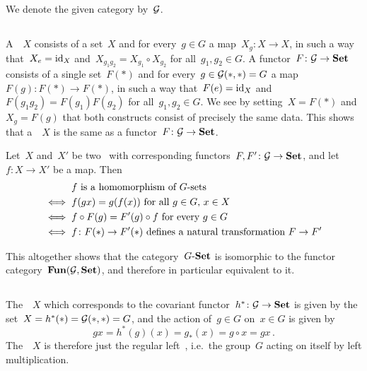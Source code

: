 \section{}

We denote the given category by~$\mathcal{G}$.





\subsection{}

A~~$X$ consists of a set~$X$ and for every~$g \in G$ a map~$X_g \colon X \to X$, in such a way that~$X_e = \operatorname{id}_X$ and~$X_{g_1 g_2} = X_{g_1} \circ X_{g_2}$ for all~$g_1, g_2 \in G$.
A functor~$F \colon \mathcal{G} \to \mathbf{Set}$ consists of a single set~$F(\ast)$ and for every~$g \in \mathcal{G}(\ast,\ast) = G$ a map~$F(g) \colon F(\ast) \to F(\ast)$, in such a way that~$F(e) = \operatorname{id}_X$ and~$F(g_1 g_2) = F(g_1) F(g_2)$ for all~$g_1, g_2 \in G$.
We see by setting~$X = F(\ast)$ and~$X_g = F(g)$ that both constructs consist of precisely the same data.
This shows that a~~$X$ is the same as a functor~$F \colon \mathcal{G} \to \mathbf{Set}$.

Let~$X$ and~$X'$ be two~ with corresponding functors~$F, F' \colon \mathcal{G} \to \mathbf{Set}$, and let~$f \colon X \to X'$ be a map.
Then
\begin{align*}
      {}& \text{$f$ is a homomorphism of~\dash{$G$}{sets}}  \\
  \iff{}& \text{$f(gx) = g(f(x))$ for all~$g \in G$,~$x \in X$} \\
  \iff{}& \text{$f \circ F(g) = F'(g) \circ f$ for every~$g \in G$} \\
  \iff{}& \text{$f \colon F(\ast) \to F'(\ast)$ defines a natural transformation~$F \to F'$}
\end{align*}

This altogether shows that the category~$\text{$G$-$\mathbf{Set}$}$ is isomorphic to the functor category~$\mathbf{Fun}(\mathcal{G}, \mathbf{Set})$, and therefore in particular equivalent to it.





\subsection{}

The~~$X$ which corresponds to the covariant functor~$h^\ast \colon \mathcal{G} \to \mathbf{Set}$ is given by the set~$X = h^\ast(\ast) = \mathcal{G}(\ast,\ast) = G$, and the action of~$g \in G$ on~$x \in G$ is given by
\[
    gx
  = h^\ast(g)(x)
  = g_*(x)
  = g \circ x
  = gx \,.
\]
The~~$X$ is therefore just the regular left~, i.e.\ the group~$G$ acting on itself by left multiplication.





